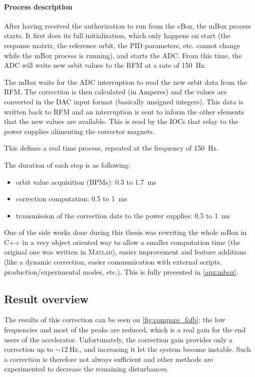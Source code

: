 \paragraph{Process description}
After having received the authorization to run from the cBox, the mBox process starts. It first does its full initialization, which only happens on start (the response matrix, the reference orbit, the PID parameters, etc. cannot change while the mBox process is running), and starts the ADC. From this time, the ADC will write new orbit values to the RFM at a rate of \SI{150}{\hertz}.

The mBox waits for the ADC interruption to read the new orbit data from the RFM. The correction is then calculated (in Amperes) and the values are converted in the DAC input format (basically unsigned integers). This data is written back to RFM and an interruption is sent to inform the other elements that the new values are available. This is read by the IOCs that relay to the power supplies alimenting the corrector magnets.

This defines a real time process, repeated at the frequency of \SI{150}{\hertz}.

The duration of each step is as following:
\begin{itemize}
\item orbit value acquisition (BPMs): 0.3 to \SI{1.7}{\milli\second}
\item correction computation: 0.5 to \SI{1}{\milli\second}
\item transmission of the correction date to the power supplies: 0.5 to \SI{1}{\milli\second}
\end{itemize}

\remark One of the side works done during this thesis was rewriting the whole mBox in C++ in a very object oriented way to allow a smaller computation time (the original one was written in \textsc{Matlab}), easier improvement and feature additions (like a dynamic correction, easier communication with external scripts, production/experimental modes, etc.). This is fully presented in \cref{apx:mbox}.

\subsection{Result overview}
The results of this correction can be seen on \cref{fig:compare_fofb}: the low frequencies and most of the peaks are reduced, which is a real gain for the end users of the accelerator. Unfortunately, the correction gain provides only a correction up to $\sim\!\SI{12}{\hertz}$., and increasing it let the system become instable. Such a correction is therefore not always sufficient and other methods are experimented to decrease the remaining disturbances.

